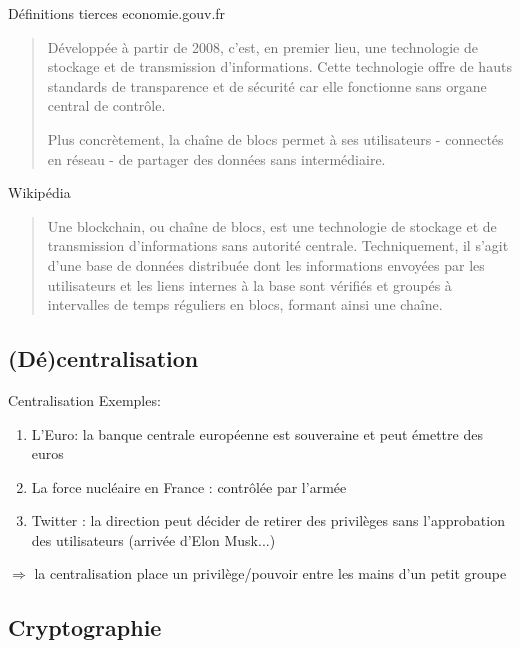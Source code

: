 \begin{frame}{Définitions tierces}
    economie.gouv.fr

    \begin{quote}
        Développée à partir de 2008, c'est, en premier lieu, une technologie de stockage et de transmission d’informations. Cette technologie offre de hauts standards de transparence et de sécurité car elle fonctionne sans organe central de contrôle.

        Plus concrètement, la chaîne de blocs permet à ses utilisateurs - connectés en réseau - de partager des données sans intermédiaire.
    \end{quote}


    Wikipédia

    \begin{quote}
        Une blockchain, ou chaîne de blocs, est une technologie de stockage et de transmission d'informations sans autorité centrale. Techniquement, il s'agit d'une base de données distribuée dont les informations envoyées par les utilisateurs et les liens internes à la base sont vérifiés et groupés à intervalles de temps réguliers en blocs, formant ainsi une chaîne.
    \end{quote}
\end{frame}

\subsection{(Dé)centralisation}

\begin{frame}{Centralisation}
    Exemples:

    \begin{enumerate}
        \item L'Euro: la banque centrale européenne est souveraine et peut émettre des euros
        \item La force nucléaire en France : contrôlée par l'armée
        \item Twitter : la direction peut décider de retirer des privilèges sans l'approbation des utilisateurs (arrivée d'Elon Musk...)
    \end{enumerate}

    $\Rightarrow$ la centralisation place un privilège/pouvoir entre les mains d'un petit groupe
\end{frame}

\subsection{Cryptographie}

